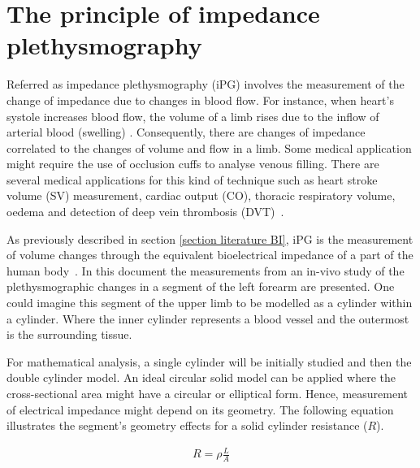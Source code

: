 \section{The principle of impedance plethysmography}                                                                                                                                                                                                 
\label{section impedance plethysmography principle}
Referred as impedance plethysmography (iPG) involves the measurement of the change of impedance due to changes in blood flow. For instance, when heart’s systole increases blood flow, the volume of a limb rises due to the inflow of arterial blood (swelling) \cite{martinsen2011bioimpedance}. Consequently, there are changes of impedance correlated to the changes of volume and flow in a limb. Some medical application might require the use of occlusion cuffs to analyse venous filling. There are several medical applications for this kind of technique such as heart stroke volume (SV) measurement, cardiac output (CO), thoracic respiratory volume, oedema and detection of deep vein thrombosis (DVT)~\cite{holohan1996plethysmography}. 

As previously described in section \ref{section literature BI}, iPG is the measurement of volume changes through the equivalent bioelectrical impedance of a part of the human body~\cite{corciova2011peripheral}. In this document the measurements from an in-vivo study of the plethysmographic changes in a segment of the left forearm are presented. One could imagine this segment of the upper limb to be modelled as a cylinder within a cylinder. Where the inner cylinder represents a blood vessel and the outermost is the surrounding tissue. 

For mathematical analysis, a single cylinder will be initially studied and then the double cylinder model. An ideal circular solid model can be applied where the cross-sectional area might have a circular or elliptical form. Hence, measurement of electrical impedance might depend on its geometry. The following equation illustrates the segment’s geometry effects for a solid cylinder resistance ($R$). 

\begin{align}
	\label{eq:resistivity}
	R=\rho\frac{L}{A}
\end{align}

